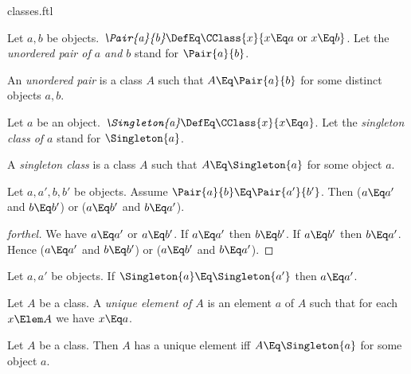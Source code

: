 \documentclass{stex}
\begin{document}
\begin{smodule}{classes.ftl}
\begin{definition*}[forthel,for={Pair,unordered pair}]
  Let $a, b$ be objects.
  $\emph{\Pair{a}{b}} \DefEq \CClass{x}{x \Eq a\text{ or }x \Eq b}$.
  Let the \emph{unordered pair of $a$ and $b$} stand for $\Pair{a}{b}$.
\end{definition*}

\begin{definition*}[forthel,for=unordered pair]
  An \emph{unordered pair} is a class $A$ such that $A \Eq \Pair{a}{b}$ for some distinct objects $a, b$.
\end{definition*}

\begin{definition*}[forthel,for={Singleton,singleton class}]
  Let $a$ be an object.
  $\emph{\Singleton{a}} \DefEq \CClass{x}{x \Eq a}$.
  Let the \emph{singleton class of $a$} stand for $\Singleton{a}$.
\end{definition*}

\begin{definition*}[forthel,for=singleton class]
  A \emph{singleton class} is a class $A$ such that $A \Eq \Singleton{a}$ for some object $a$.
\end{definition*}

\begin{proposition*}[forthel]
  Let $a, a', b, b'$ be objects.
  Assume $\Pair{a}{b} \Eq \Pair{a'}{b'}$.
  Then ($a \Eq a'$ and $b \Eq b'$) or ($a \Eq b'$ and $b \Eq a'$).
\end{proposition*}
\begin{proof}[forthel]
  We have $a \Eq a'$ or $a \Eq b'$.
  If $a \Eq a'$ then $b \Eq b'$.
  If $a \Eq b'$ then $b \Eq a'$.
  Hence ($a \Eq a'$ and $b \Eq b'$) or ($a \Eq b'$ and $b \Eq a'$).
\end{proof}

\begin{proposition*}[forthel]
  Let $a, a'$ be objects.
  If $\Singleton{a} \Eq \Singleton{a'}$ then $a \Eq a'$.
\end{proposition*}

\begin{definition*}[forthel,for=unique element]
  Let $A$ be a class.
  A \emph{unique element of $A$} is an element $a$ of $A$ such that for each $x \Elem A$ we have $x \Eq a$.
\end{definition*}

\begin{proposition*}[forthel]
  Let $A$ be a class.
  Then $A$ has a unique element iff $A \Eq \Singleton{a}$ for some object $a$.
\end{proposition*}


\end{smodule}
\end{document}
